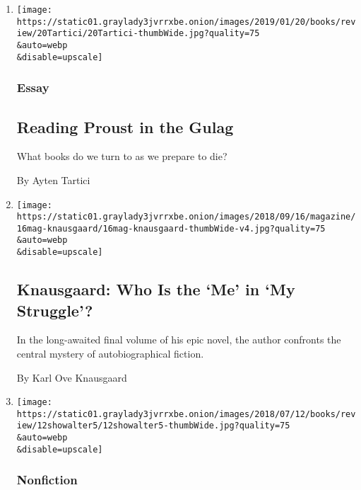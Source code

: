 \begin{enumerate}
\def\labelenumi{\arabic{enumi}.}
\item
  \href{/2019/01/16/books/review/ayten-tartici.html}{}

  \texttt{[image: https://static01.graylady3jvrrxbe.onion/images/2019/01/20/books/review/20Tartici/20Tartici-thumbWide.jpg?quality=75\\\&auto=webp\\\&disable=upscale]}

  \hypertarget{essay}{%
  \subsubsection{Essay}\label{essay}}

  \hypertarget{reading-proust-in-the-gulag}{%
  \subsection{Reading Proust in the
  Gulag}\label{reading-proust-in-the-gulag}}

  What books do we turn to as we prepare to die?

  By Ayten Tartici
\item
  \href{/2018/09/17/magazine/knausgaard-my-struggle-writing-literature.html}{}

  \texttt{[image: https://static01.graylady3jvrrxbe.onion/images/2018/09/16/magazine/16mag-knausgaard/16mag-knausgaard-thumbWide-v4.jpg?quality=75\\\&auto=webp\\\&disable=upscale]}

  \hypertarget{knausgaard-who-is-the-me-in-my-struggle}{%
  \subsection{Knausgaard: Who Is the `Me' in `My
  Struggle'?}\label{knausgaard-who-is-the-me-in-my-struggle}}

  In the long-awaited final volume of his epic novel, the author
  confronts the central mystery of autobiographical fiction.

  By Karl Ove Knausgaard
\item
  \href{/2018/07/13/books/review/caroline-weber-prousts-duchess-belle-epoque.html}{}

  \texttt{[image: https://static01.graylady3jvrrxbe.onion/images/2018/07/12/books/review/12showalter5/12showalter5-thumbWide.jpg?quality=75\\\&auto=webp\\\&disable=upscale]}

  \hypertarget{nonfiction}{%
  \subsubsection{Nonfiction}\label{nonfiction}}


\end{enumerate}
